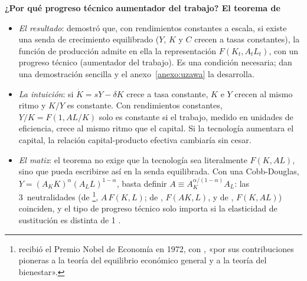 \documentclass[11pt]{article}
\begin{document}
\begin{anotaciones}
\textbf{¿Por qué progreso técnico aumentador del trabajo? El teorema de }
\begin{itemize}
\item \emph{El resultado}: \textcite{Uzawa1961} demostró que, con rendimientos constantes a escala, si existe una senda de crecimiento equilibrado ($Y$, $K$ y $C$ crecen a tasas constantes), la función de producción admite en ella la representación $F(K_t,A_tL_t)$, con un progreso técnico  (aumentador del trabajo). Es una condición necesaria; \textcite{JonesScrimgeour2008New} dan una demostración sencilla y el anexo~\ref{anexo:uzawa} la desarrolla.
\item \emph{La intuición}: si $\dot K=sY-\delta K$ crece a tasa constante, $K$ e $Y$ crecen al mismo ritmo y $K/Y$ es constante. Con rendimientos constantes, $Y/K=F(1,AL/K)$ solo es constante si el trabajo, medido en unidades de eficiencia, crece al mismo ritmo que el capital. Si la tecnología aumentara el capital, la relación capital-producto efectiva cambiaría sin cesar.
\item \emph{El matiz}: el teorema no exige que la tecnología sea literalmente $F(K,AL)$, sino que pueda escribirse así en la senda equilibrada. Con una Cobb-Douglas, $Y=(A_KK)^{\alpha}(A_LL)^{1-\alpha}$, basta definir $A\equiv A_K^{\alpha/(1-\alpha)}A_L$: las 3~neutralidades (de \footnote{ recibió el Premio Nobel de Economía en 1972, con , «por sus contribuciones pioneras a la teoría del equilibrio económico general y a la teoría del bienestar»\nocite{Nobel1972HicksArrow}.}, $A\,F(K,L)$; de , $F(AK,L)$, y de , $F(K,AL)$) coinciden, y el tipo de progreso técnico solo importa si la elasticidad de sustitución es distinta de 1 .
\end{itemize}
\end{anotaciones}
\end{document}
